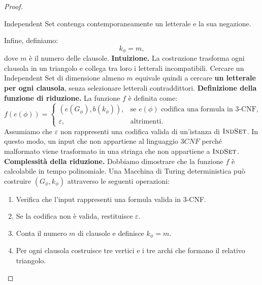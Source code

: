 \begin{proof}
\begin{enumerate}
    Independent Set contenga contemporaneamente
    un letterale e la sua negazione.
\end{enumerate}
Infine, definiamo:
\[
\boxed{k_\phi=m,}
\]
dove $m$ è il numero delle clausole.
\textbf{Intuizione.}
La costruzione trasforma ogni clausola
in un triangolo e collega tra loro
i letterali incompatibili.
Cercare un Independent Set di dimensione
almeno $m$ equivale quindi a cercare
\textbf{un letterale per ogni clausola},
senza selezionare letterali contraddittori.
\smallskip
\noindent
\textbf{Definizione della funzione di riduzione.}
La funzione $f$ è definita come:
\[
f(e(\phi))=
\begin{cases}
(e(G_\phi),b(k_\phi)),
& \text{se }e(\phi)\text{ codifica una formula in 3-CNF},\\
\varepsilon,
& \text{altrimenti}.
\end{cases}
\]
Assumiamo che $\varepsilon$ non rappresenti
una codifica valida di un'istanza di $\textsc{IndSet}$.
In questo modo, un input che non appartiene
al linguaggio $3CNF$ perché malformato
viene trasformato in una stringa
che non appartiene a $\textsc{IndSet}$.
\smallskip
\noindent
\textbf{Complessità della riduzione.}
Dobbiamo dimostrare che la funzione $f$
è calcolabile in tempo polinomiale.
Una Macchina di Turing deterministica
può costruire $(G_\phi,k_\phi)$
attraverso le seguenti operazioni:
\begin{enumerate}
    \item Verifica che l'input rappresenti
    una formula valida in $3$-CNF.

    \item Se la codifica non è valida,
    restituisce $\varepsilon$.

    \item Conta il numero $m$ di clausole
    e definisce $k_\phi=m$.

    \item Per ogni clausola costruisce
    tre vertici e i tre archi che
    formano il relativo triangolo.


\end{enumerate}
\end{proof}
